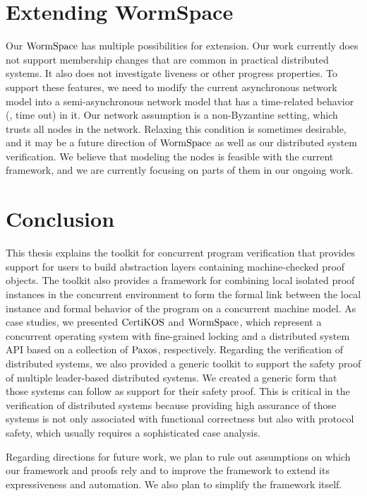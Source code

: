 \section{Extending WormSpace}

Our $\mathrm{WormSpace}$ has multiple possibilities for extension. 
Our work currently does not support membership changes that are common in practical distributed systems. 
It also does not investigate liveness or other progress properties. 
To support these features, we need to modify the current asynchronous network model into a semi-asynchronous network model that has a time-related behavior (\ie, time out) in it. 
Our network assumption is a non-Byzantine setting, 
which trusts all nodes in the network. 
Relaxing this condition is sometimes desirable, and it may be a future direction of $\mathrm{WormSpace}$ as well as our distributed system verification. 
We believe that modeling the nodes is feasible with the current framework, and we are currently focusing on parts of them in our ongoing work.
 
 
\section{Conclusion}

This thesis explains the toolkit for concurrent program verification that provides support for users to build abstraction layers containing machine-checked proof objects. 
The toolkit also provides a framework for combining local isolated proof instances in the concurrent environment to form the formal link between the local instance and formal behavior of the program on a concurrent machine model. 
As case studies, we presented $\mathrm{CertiKOS}$ and $\mathrm{WormSpace}$, which represent a concurrent operating system with fine-grained locking and a distributed system API based on a collection of $\mathrm{Paxos}$, respectively. 
Regarding the verification of distributed systems, we also provided a generic toolkit to support the safety proof of multiple leader-based distributed systems. 
We created a generic form that those systems can follow as support for their safety proof. 
This is critical in the verification of distributed systems because providing high assurance of those systems is not only associated with functional correctness but also with protocol safety, which usually requires a sophisticated case analysis. 

Regarding directions for future work, we plan to rule out assumptions on which our framework and proofs rely and to improve the framework to extend its expressiveness and automation. We also plan to simplify the framework itself. 

